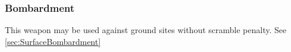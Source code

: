 \subsubsection{Bombardment}
This weapon may be used against ground sites without scramble penalty. See \ref{sec:SurfaceBombardment}